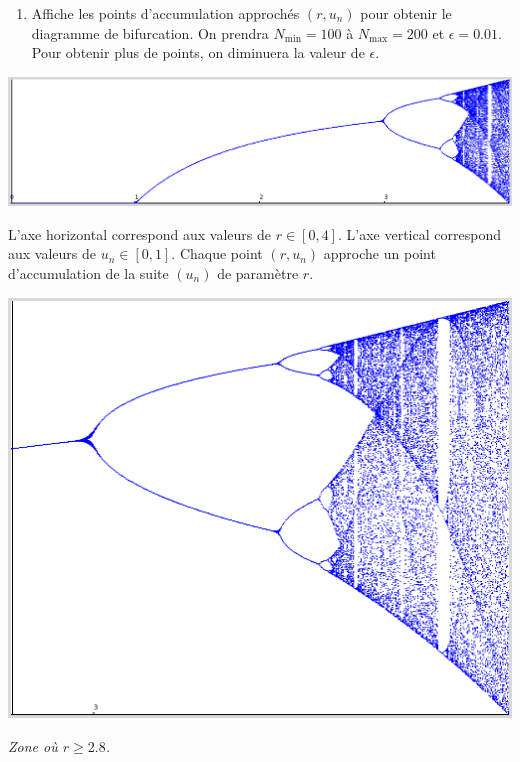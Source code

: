 \documentclass[11pt,class=report,crop=false]{standalone}
\begin{document}
\begin{activite}[]
\begin{enumerate}
  \item Affiche les points d'accumulation approchés $(r,u_n)$ 
  pour obtenir le diagramme de bifurcation.
  On prendra  $N_{\min} = 100$ à $N_{\max} = 200$ et $\epsilon = 0.01$. 
  Pour obtenir plus de points, on diminuera la valeur de $\epsilon$.
  
  
\end{enumerate} 

\begin{center}
\includegraphics[scale=\myscale,scale=0.3]{ecran-lyapunov-1}
\end{center}

L'axe horizontal correspond aux valeurs de $r \in [0,4]$.
L'axe vertical correspond aux valeurs de $u_n \in [0,1]$.
Chaque point $(r,u_n)$ approche un point d'accumulation de la suite $(u_n)$ de paramètre $r$.

\bigskip


\begin{center}
\includegraphics[scale=\myscale,scale=0.3]{ecran-lyapunov-2}

\emph{Zone où $r \ge 2.8$.}

\end{center}


\end{activite}
\end{document}
